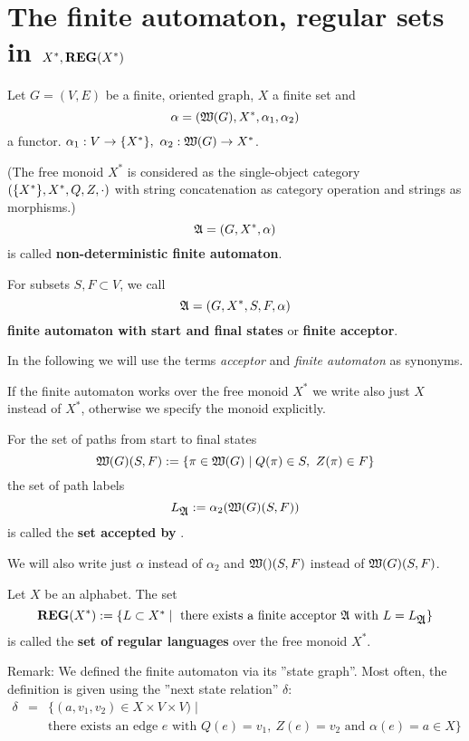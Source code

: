 \section{The finite automaton, regular sets in $X^*, \mbox{{\bf REG}}(X^*)$}

\begin{definition}
Let $G = (V, E)$ be a finite, oriented graph, $X$ a finite set and
\[\alpha = (\mbox{$\mathfrak{W}({G})$}, X^*,\alpha_1, \alpha_2)\]
a functor. $\alpha_1 : V \to \mbox{$\{X^*\}$},\ \alpha_2 : \mbox{$\mathfrak{W}({G})$} \to X^*$.

(The free monoid $X^*$ is considered as the single-object category
$(\mbox{$\{X^*\}$}, X^*, Q, Z, \cdot)$ with string concatenation as category
operation and strings as morphisms.)
\[ \mbox{$\mathfrak{A}$} = (G, X^*, \alpha) \]
is called {\bf non-deterministic finite automaton}.

For subsets $S, F \subset V$, we call 
\[ \mbox{$\mathfrak{A}$} = (G, X^*, S, F, \alpha) \]
{\bf finite automaton with start and final states} or {\bf finite acceptor}.
\end{definition}

In the following we will use the terms {\em acceptor} and {\em finite automaton}
as synonyms.

If the finite automaton works over the free monoid $X^*$ we write also just $X$
instead of $X^*$, otherwise we specify the monoid explicitly.

For the set of paths from start to final states 
\[ \mbox{$\mathfrak{W}({G})$}(S, F) := \mbox{$\{\pi \in \mbox{$\mathfrak{W}({G})$} \mid Q(\pi) \in S,\ Z(\pi)
\in F\}$} \]
the set of path labels
\[ L_{\mbox{$\mathfrak{A}$}} := \alpha_2(\mbox{$\mathfrak{W}({G})$}(S, F)) \]
is called the {\bf set accepted by} .

We will also write just $\alpha$ instead of $\alpha_2$ and $\mbox{$\mathfrak{W}({})$}(S,F)$
instead of $\mbox{$\mathfrak{W}({G})$}(S,F)$.

\begin{definition}
Let $X$ be an alphabet. The set
\[ \mbox{{\bf REG}}(X^*) := \mbox{$\{L \subset X^* \mid \mbox{ there exists a finite acceptor
}\mbox{$\mathfrak{A}$} \mbox{ with } L = L_{\mbox{$\mathfrak{A}$}}\}$} \]
is called the {\bf set of regular languages} over the free monoid $X^*$.
\end{definition}

Remark: We defined the finite automaton via its ''state graph''. Most
often, the definition is given using the ''next state relation'' $\delta$:
\begin{eqnarray*}
\delta &=& \{(a, v_1, v_2) \in X \times V \times V) \mid \\
&& \mbox{there exists an edge $e$ with $Q(e) = v_1,\ Z(e) = v_2$ and }
\alpha(e) = a \in X \}
\end{eqnarray*}


